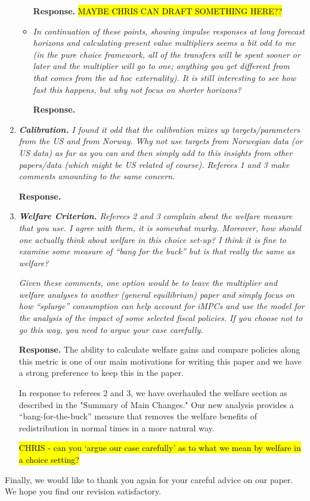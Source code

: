 \documentclass[12pt,letterpaper,english]{article}
\begin{document}
\begin{enumerate}
\begin{itemize}
\noindent \textbf{Response.} \hl{MAYBE CHRIS CAN DRAFT SOMETHING HERE??}
	
	\item \textit{In continuation of these points, showing impulse responses at long forecast horizons and calculating present value multipliers seems a bit odd to me (in	the pure choice framework, all of the transfers will be spent sooner or later and	the multiplier will go to one; anything you get different from that comes from the ad hoc externality). It is still interesting to see how fast this happens, but why not focus on shorter horizons?}
	
\noindent \textbf{Response.} 
	
\end{itemize}



\item \textit{\textbf{Calibration.} I found it odd that the calibration mixes up targets/parameters from the US and from Norway. Why not use targets from Norwegian data (or US data) as far as you can and then simply add to this insights from other papers/data
(which might be US related of course). Referees 1 and 3 make comments amounting to the same concern.}	

\noindent \textbf{Response.} 

\item \textit{\textbf{Welfare Criterion.} Referees 2 and 3 complain about the welfare measure that you use. I agree with them, it is somewhat murky. Moreover, how should one	actually think about welfare in this choice set-up? I think it is fine to examine some	measure of ``bang for the buck'' but is that really the same as welfare?} 

\textit{Given these comments, one option would be to leave the multiplier and welfare	analyses to another (general equilibrium) paper and simply focus on how ``splurge''	consumption can help account for iMPCs and use the model for the analysis of the impact of some selected fiscal policies. If you choose not to go this way, you need to argue your case carefully.}	

\noindent \textbf{Response.} The ability to calculate welfare gains and compare policies along this metric is one of our main motivations for writing this paper and we have a strong preference to keep this in the paper.

In response to referees 2 and 3, we have overhauled the welfare section as described in the "Summary of Main Changes." Our new analysis provides a ``bang-for-the-buck'' measure that removes the welfare benefits of redistribution in normal times in a more natural way.

\hl{CHRIS - can you `argue our case carefully' as to what we mean by welfare in a choice setting?} %

\end{enumerate}

\bigskip

\noindent Finally, we would like to thank you again for your careful advice on our paper. We hope you find our revision satisfactory.

%

\end{document}
